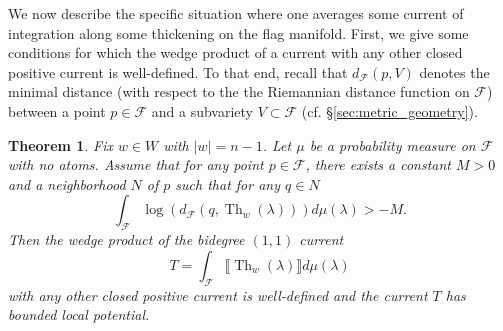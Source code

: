 \documentclass[12pt]{amsbook}%
\newtheorem{thm}{Theorem}[chapter]
\theoremstyle{definition}
\theoremstyle{remark}
\numberwithin{section}{chapter}
\numberwithin{subsection}{section}
\numberwithin{figure}{chapter}
\DeclareMathOperator{\Th}{Th}
\def\cF{{\mathscr{F}}}
\def\La{\Lambda}
\def\kap{}
\begin{document}
{{We now describe the specific situation where one averages some current of integration along some thickening on the flag manifold. 
First, we give some conditions for which  the wedge product of a current with any other closed positive current is well-defined. 
To that end, recall that $d_{\cF}(p,V)$ denotes the minimal distance (with respect to the 
the Riemannian distance function on $\cF$) between a point $p\in \cF$ and a subvariety $V \subset \cF$ (cf. \S \ref{sec:metric_geometry}). 

 
\begin{thm} \label{thm_wedgeable} Fix $w\in W$ with $|w|=n -1$.  Let $\mu $ be a probability measure on $\cF$ with no atoms. %
Assume that for any point $p\in \cF$, there exists a constant $M> 0$ and a neighborhood  $N$ of $p$   such that for any $q \in N$ 
\begin{equation} \label{eq_cond_integrability}
\int_{\cF} \log \left (  d_{\cF}(q, \Th_w(\lambda))\right ) d\mu(\lambda) > -M.
\end{equation} 
Then the wedge product of the bidegree $(1,1)$ current 
$$
  T = \int_{\cF} \llbracket \Th_w(\lambda) \rrbracket d\mu(\lambda) $$
  with any other closed positive current is well-defined and the current $T$ has bounded local potential.  

\end{thm}


}}
\end{document}
